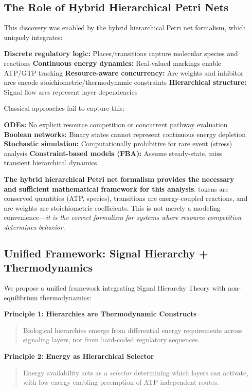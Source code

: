 \documentclass[twocolumn,11pt]{article}
\begin{document}
\subsection{The Role of Hybrid Hierarchical Petri Nets}

This discovery was enabled by the hybrid hierarchical Petri net formalism, which uniquely integrates:


\textbf{Discrete regulatory logic:} Places/transitions capture molecular species and reactions
\textbf{Continuous energy dynamics:} Real-valued markings enable ATP/GTP tracking
\textbf{Resource-aware concurrency:} Arc weights and inhibitor arcs encode stoichiometric/thermodynamic constraints
\textbf{Hierarchical structure:} Signal flow arcs represent layer dependencies


Classical approaches fail to capture this:

\textbf{ODEs:} No explicit resource competition or concurrent pathway evaluation
\textbf{Boolean networks:} Binary states cannot represent continuous energy depletion
\textbf{Stochastic simulation:} Computationally prohibitive for rare event (stress) analysis
\textbf{Constraint-based models (FBA):} Assume steady-state, miss transient hierarchical dynamics


\textbf{The hybrid hierarchical Petri net formalism provides the necessary and sufficient mathematical framework for this analysis}: tokens are conserved quantities (ATP, species), transitions are energy-coupled reactions, and arc weights are stoichiometric coefficients. This is not merely a modeling convenience—\textit{it is the correct formalism for systems where resource competition determines behavior}.

\subsection{Unified Framework: Signal Hierarchy + Thermodynamics}

We propose a unified framework integrating Signal Hierarchy Theory with non-equilibrium thermodynamics:

\textbf{Principle 1: Hierarchies are Thermodynamic Constructs}
\begin{quote}
    Biological hierarchies emerge from differential energy requirements across signaling layers, not from hard-coded regulatory sequences.
\end{quote}

\textbf{Principle 2: Energy as Hierarchical Selector}
\begin{quote}
    Energy availability acts as a \textit{selector} determining which layers can activate, with low energy enabling preemption of ATP-independent routes.
\end{quote}
\end{document}
